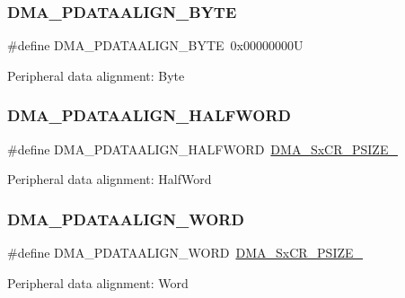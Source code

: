 \subsubsection{\texorpdfstring{DMA\_PDATAALIGN\_BYTE}{DMA\_PDATAALIGN\_BYTE}}
{\footnotesize\ttfamily \#define D\+M\+A\+\_\+\+P\+D\+A\+T\+A\+A\+L\+I\+G\+N\+\_\+\+B\+Y\+TE~0x00000000U}

Peripheral data alignment\+: Byte \mbox{\label{group___d_m_a___peripheral__data__size_gac08bfd907442dba5358830b247135bcc}} 
\subsubsection{\texorpdfstring{DMA\_PDATAALIGN\_HALFWORD}{DMA\_PDATAALIGN\_HALFWORD}}
{\footnotesize\ttfamily \#define D\+M\+A\+\_\+\+P\+D\+A\+T\+A\+A\+L\+I\+G\+N\+\_\+\+H\+A\+L\+F\+W\+O\+RD~\mbox{\hyperlink{group___peripheral___registers___bits___definition_gab05cf3e3f7c9edae5c70d59b3b75b14f}{D\+M\+A\+\_\+\+Sx\+C\+R\+\_\+\+P\+S\+I\+Z\+E\+\_}}}

Peripheral data alignment\+: Half\+Word \mbox{\label{group___d_m_a___peripheral__data__size_gaad50e97cbc4a726660db9c3f42ac93b0}} 
\subsubsection{\texorpdfstring{DMA\_PDATAALIGN\_WORD}{DMA\_PDATAALIGN\_WORD}}
{\footnotesize\ttfamily \#define D\+M\+A\+\_\+\+P\+D\+A\+T\+A\+A\+L\+I\+G\+N\+\_\+\+W\+O\+RD~\mbox{\hyperlink{group___peripheral___registers___bits___definition_ga8f376d0900380a3045cbeadd6a037302}{D\+M\+A\+\_\+\+Sx\+C\+R\+\_\+\+P\+S\+I\+Z\+E\+\_}}}

Peripheral data alignment\+: Word 